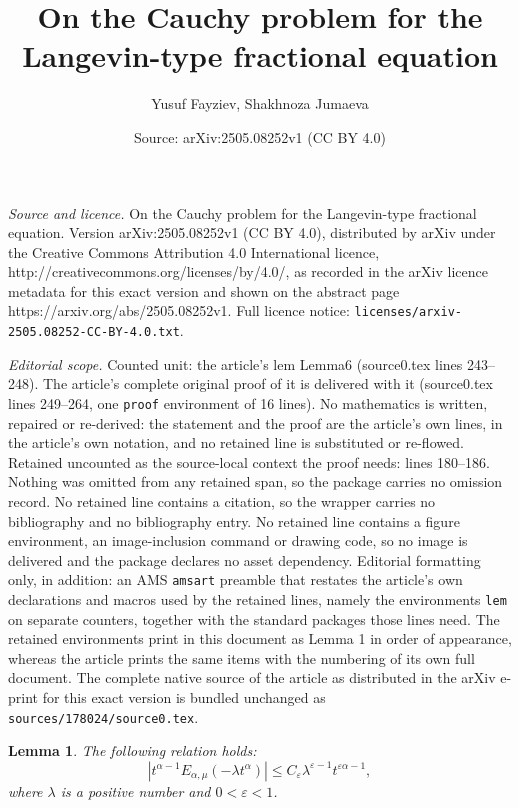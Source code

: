 \documentclass[10pt,a4paper]{amsart}
\title{On the Cauchy problem for the Langevin-type fractional equation}
\author{Yusuf Fayziev, Shakhnoza Jumaeva}
\date{Source: arXiv:2505.08252v1 (CC BY 4.0)}
\newtheorem{lem}{Lemma}
\begin{document}
\maketitle

\noindent\emph{Source and licence.} On the Cauchy problem for the Langevin-type fractional equation. Version arXiv:2505.08252v1 (CC BY 4.0), distributed by arXiv under the Creative Commons Attribution 4.0 International licence, http://creativecommons.org/licenses/by/4.0/, as recorded in the arXiv licence metadata for this exact version and shown on the abstract page https://arxiv.org/abs/2505.08252v1. Full licence notice: \texttt{licenses/arxiv-2505.08252-CC-BY-4.0.txt}.\par\smallskip

\noindent\textit{Editorial scope.} Counted unit: the article's lem Lemma6 (source0.tex lines 243--248). The article's complete original proof of it is delivered with it (source0.tex lines 249--264, one \texttt{proof} environment of 16 lines). No mathematics is written, repaired or re-derived: the statement and the proof are the article's own lines, in the article's own notation, and no retained line is substituted or re-flowed.  Retained uncounted as the source-local context the proof needs: lines 180--186.  Nothing was omitted from any retained span, so the package carries no omission record.  No retained line contains a citation, so the wrapper carries no bibliography and no bibliography entry.  No retained line contains a figure environment, an image-inclusion command or drawing code, so no image is delivered and the package declares no asset dependency.  Editorial formatting only, in addition: an AMS \texttt{amsart} preamble that restates the article's own declarations and macros used by the retained lines, namely the environments \texttt{lem} on separate counters, together with the standard packages those lines need.  The retained environments print in this document as Lemma 1 in order of appearance, whereas the article prints the same items with the numbering of its own full document.  The complete native source of the article as distributed in the arXiv e-print for this exact version is bundled unchanged as \texttt{sources/178024/source0.tex}.
\begin{lem}\label{Lemma2}
  The following relation holds:
$$
|t^{\alpha-1}E_{\alpha,\mu}(-\lambda t^\alpha)|\leq C_\varepsilon \lambda^{\varepsilon-1}t^{\varepsilon\alpha-1} ,
$$
where $\lambda$ is a positive number and $0<\varepsilon<1$.
\end{lem}
\end{document}
